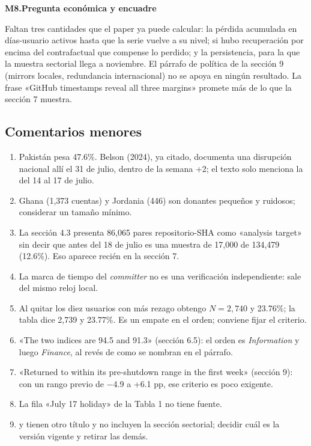 \documentclass[11pt,a4paper]{article}
\newcommand{\coment}[2]{\medskip\noindent\textbf{#1.\enspace #2}\par\nopagebreak}
\begin{document}
\coment{M8}{Pregunta económica y encuadre}
Faltan tres cantidades que el paper ya puede calcular: la pérdida acumulada en días-usuario activos
hasta que la serie vuelve a su nivel; si hubo recuperación por encima del contrafactual que compense
lo perdido; y la persistencia, para la que la muestra sectorial llega a noviembre. El párrafo de
política de la sección 9 (mirrors locales, redundancia internacional) no se apoya en ningún resultado.
La frase «GitHub timestamps reveal all three margins» promete más de lo que la sección 7 muestra.

\subsection{Comentarios menores}

\begin{enumerate}
\item Pakistán pesa 47.6\%. Belson (2024), ya citado, documenta una disrupción nacional allí el 31 de
julio, dentro de la semana +2; el texto solo menciona la del 14 al 17 de julio.
\item Ghana (1,373 cuentas) y Jordania (446) son donantes pequeños y ruidosos; considerar un tamaño
mínimo.
\item La sección 4.3 presenta 86,065 pares repositorio-SHA como «analysis target» sin decir que antes
del 18 de julio es una muestra de 17,000 de 134,479 (12.6\%). Eso aparece recién en la sección 7.
\item La marca de tiempo del \emph{committer} no es una verificación independiente: sale del mismo
reloj local.
\item Al quitar los diez usuarios con más rezago obtengo $N=2{,}740$ y 23.76\%; la tabla dice 2,739 y
23.77\%. Es un empate en el orden; conviene fijar el criterio.
\item «The two indices are 94.5 and 91.3» (sección 6.5): el orden es \emph{Information} y luego
\emph{Finance}, al revés de como se nombran en el párrafo.
\item «Returned to within its pre-shutdown range in the first week» (sección 9): con un rango previo
de −4.9 a +6.1 pp, ese criterio es poco exigente.
\item La fila «July 17 holiday» de la Tabla 1 no tiene fuente.
\item {} y  tienen otro título y no incluyen la sección
sectorial; decidir cuál es la versión vigente y retirar las demás.
\end{enumerate}
\end{document}
